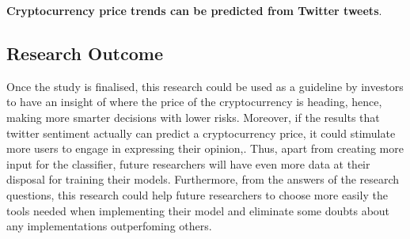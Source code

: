 \documentclass{article}
\begin{document}
	\textbf{Cryptocurrency price trends can be predicted from Twitter tweets}.
	
	\subsection{Research Outcome}
	
	Once the study is finalised, this research could be used as a guideline by investors to have an insight of where the price of the cryptocurrency is heading, hence, making more smarter decisions with lower risks. Moreover, if the results that twitter sentiment actually can predict a cryptocurrency price, it could stimulate more users to engage in expressing their opinion,. Thus, apart from creating more input for the classifier, future researchers will have even more data at their disposal for training their models. Furthermore, from the answers of the research questions, this research could help future researchers to choose more easily the tools needed when implementing their model and eliminate some doubts about any implementations outperfoming others.
	
	
	
	
   
  
\end{document}

